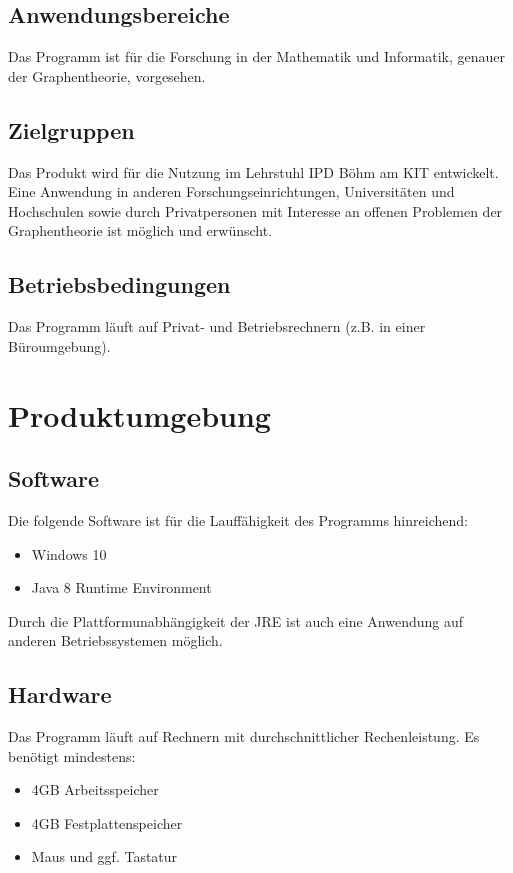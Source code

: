 \documentclass{article}
\begin{document}
	\subsection{Anwendungsbereiche}
	Das Programm ist für die Forschung in der Mathematik und Informatik, genauer der Graphentheorie, vorgesehen.
	
	\subsection{Zielgruppen}
	Das Produkt wird für die Nutzung im Lehrstuhl IPD Böhm am KIT entwickelt. Eine Anwendung in anderen Forschungseinrichtungen, Universitäten und Hochschulen sowie durch Privatpersonen mit Interesse an offenen Problemen der Graphentheorie ist möglich und erwünscht.
	
	\subsection{Betriebsbedingungen}
	Das Programm läuft auf Privat- und Betriebsrechnern (z.B. in einer Büroumgebung).
	
	
	
	\section{Produktumgebung}
	
	\subsection{Software}
	Die folgende Software ist für die Lauffähigkeit des Programms hinreichend:
	\begin{itemize}
		\item{Windows 10}
		\item{Java 8 Runtime Environment}
	\end{itemize}
	Durch die Plattformunabhängigkeit der JRE ist auch eine Anwendung auf anderen Betriebssystemen möglich.
	
	\subsection{Hardware}
	Das Programm läuft auf Rechnern mit durchschnittlicher Rechenleistung. Es benötigt mindestens:
	\begin{itemize}
		\item{4GB Arbeitsspeicher}
		\item{4GB Festplattenspeicher}
		\item{Maus und ggf. Tastatur}
	\end{itemize}
	
\end{document}
